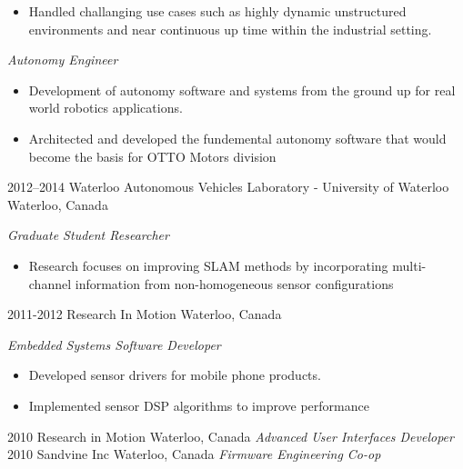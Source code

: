 \documentclass[stdletter]{friggeri-cv} %
\begin{document}
\begin{entrylist}
{\begin{itemize}
    \item Handled challanging use cases such as highly dynamic unstructured environments and near continuous up time within the industrial setting.
\end{itemize} 
\emph{Autonomy Engineer} 
\begin{itemize}
    \item Development of autonomy software and systems from the ground up for real world robotics applications.
    \item Architected and developed the fundemental autonomy software that would become the basis for OTTO Motors division
\end{itemize} }
\entry
{2012--2014}
{Waterloo Autonomous Vehicles Laboratory - University of Waterloo}
{Waterloo, Canada}
{\emph{Graduate Student Researcher} 
\begin{itemize}
    \item Research focuses on improving SLAM methods by incorporating multi-channel information from non-homogeneous sensor configurations
\end{itemize} }
\entry
{2011-2012}
{Research In Motion}
{Waterloo, Canada}
{\emph{Embedded Systems Software Developer} 
\begin{itemize}
    \item Developed sensor drivers for mobile phone products. 
    \item Implemented sensor DSP algorithms to improve performance
\end{itemize} }
\entry
{2010}
{Research in Motion}
{Waterloo, Canada}
{\emph{Advanced User Interfaces Developer}}
\entry
{2010}
{Sandvine Inc}
{Waterloo, Canada}
{\emph{Firmware Engineering Co-op}}
\end{entrylist}

\end{document}
